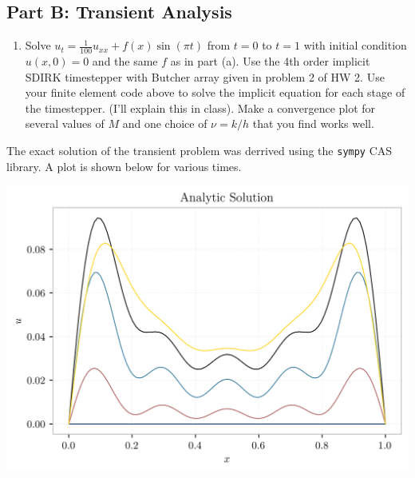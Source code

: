\documentclass[
  11pt,
]{article}
\providecommand{\tightlist}{%
  \setlength{\itemsep}{0pt}\setlength{\parskip}{0pt}}
\let\origfigure\figure
\let\endorigfigure\endfigure
\renewenvironment{figure}[1][2] {
    \expandafter\origfigure\expandafter[H]
} {
    \endorigfigure
}
\renewenvironment{quote}%
{%
\definecolor{shadecolor}{rgb}{0.96,0.96,0.96}%
\begin{shaded*}\quoting[leftmargin=0pt, vskip=0pt]
}%
{\endquoting\end{shaded*}}
\begin{document}
\newpage{}

\hypertarget{part-b-transient-analysis}{%
\subsection{Part B: Transient
Analysis}\label{part-b-transient-analysis}}

\begin{quote}
\begin{enumerate}
\def\labelenumi{(\alph{enumi})}
\setcounter{enumi}{1}
\tightlist
\item
  Solve \(u_t=\frac1{100}u_{xx}+f(x)\sin(\pi t)\) from \(t=0\) to
  \(t=1\) with initial condition \(u(x,0)=0\) and the same \(f\) as in
  part (a). Use the 4th order implicit SDIRK timestepper with Butcher
  array given in problem 2 of HW 2. Use your finite element code above
  to solve the implicit equation for each stage of the timestepper.
  (I'll explain this in class). Make a convergence plot for several
  values of \(M\) and one choice of \(\nu=k/h\) that you find works
  well.
\end{enumerate}
\end{quote}

The exact solution of the transient problem was derrived using the
\texttt{sympy} CAS library. A plot is shown below for various times.

\begin{figure}
\centering
\includegraphics{../img/p3b-exact.png}
\caption{Analytic solution curves}
\end{figure}
\end{document}
